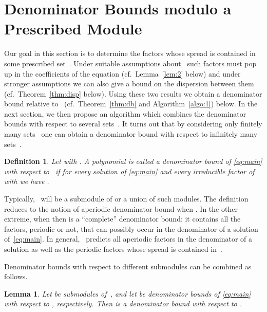 \documentclass[a4paper]{sig-alternate}
\newtheorem{lemma}{Lemma}
\newtheorem{definition}{Definition}
\begin{document}
\section{Denominator Bounds modulo a Prescribed Module}

Our goal in this section is to determine the factors whose spread is contained
in some prescribed set~. Under suitable assumptions
about~ such factors must pop up in the coefficients of the equation (cf.\
Lemma~\ref{lem:2} below) and under stronger assumptions we can also give a bound
on the dispersion between them (cf.\ Theorem~\ref{thm:disp} below). Using these
two results we obtain a denominator bound relative to~ (cf.\
Theorem~\ref{thm:db} and Algorithm~\ref{algo:1}) below. In the next section, we
then propose an algorithm which combines the denominator bounds with respect to
several sets~. It turns out that by considering only finitely many sets~ 
one can obtain a denominator bound with respect to infinitely many sets~.

\begin{definition}
  Let  with .
  A polynomial  is called a denominator bound of \eqref{eq:main}
  with respect to~ if for every solution 
  of \eqref{eq:main} and every irreducible factor  of~ with
   we have .
\end{definition}

Typically, ~will be a submodule of  or a union of such modules.
The definition reduces to the notion of aperiodic denominator bound
when . In the other extreme, when  then  is
a ``complete'' denominator bound: it contains all the factors, periodic or not,
that can possibly occur in the denominator of a solution~ of~\eqref{eq:main}.
In general, ~predicts all aperiodic factors in the denominator of a solution
as well as the periodic factors whose spread is contained in~.

Denominator bounds with respect to different submodules can be combined as follows.

\begin{lemma}\label{lemma:lcm}
  Let  be submodules of~, and let
   be denominator bounds of \eqref{eq:main} with respect to
  , respectively. Then
   is a denominator bound with respect to
  .
\end{lemma}
\end{document}
